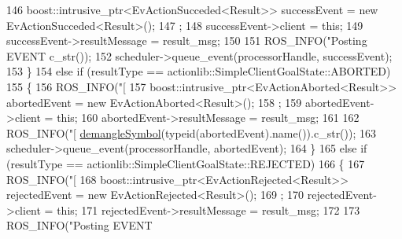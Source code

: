 \begin{DoxyCode}
{{{{{146                     boost::intrusive\_ptr<EvActionSucceded<Result>> successEvent = \textcolor{keyword}{new} 
      EvActionSucceded<Result>();
147                     ;
148                     successEvent->client = \textcolor{keyword}{this};
149                     successEvent->resultMessage = result\_msg;
150 
151                     ROS\_INFO(\textcolor{stringliteral}{"Posting EVENT %
      c\_str());
152                     scheduler->queue\_event(processorHandle, successEvent);
153                 \}
154                 \textcolor{keywordflow}{else} \textcolor{keywordflow}{if} (resultType == actionlib::SimpleClientGoalState::ABORTED)
155                 \{
156                     ROS\_INFO(\textcolor{stringliteral}{"[%
157                     boost::intrusive\_ptr<EvActionAborted<Result>> abortedEvent = \textcolor{keyword}{new} 
      EvActionAborted<Result>();
158                     ;
159                     abortedEvent->client = \textcolor{keyword}{this};
160                     abortedEvent->resultMessage = result\_msg;
161 
162                     ROS\_INFO(\textcolor{stringliteral}{"[%
      \hyperlink{common_8h_a401d7e4f000fd4246a20be1e7d5ec2fc}{demangleSymbol}(\textcolor{keyword}{typeid}(abortedEvent).name()).c\_str());
163                     scheduler->queue\_event(processorHandle, abortedEvent);
164                 \}
165                 \textcolor{keywordflow}{else} \textcolor{keywordflow}{if} (resultType == actionlib::SimpleClientGoalState::REJECTED)
166                 \{
167                     ROS\_INFO(\textcolor{stringliteral}{"[%
168                     boost::intrusive\_ptr<EvActionRejected<Result>> rejectedEvent = \textcolor{keyword}{new} 
      EvActionRejected<Result>();
169                     ;
170                     rejectedEvent->client = \textcolor{keyword}{this};
171                     rejectedEvent->resultMessage = result\_msg;
172 
173                     ROS\_INFO(\textcolor{stringliteral}{"Posting EVENT %
}}}}}}}}}}
\end{DoxyCode}
